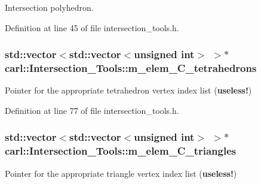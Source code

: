 Intersection polyhedron. 



Definition at line 45 of file intersection\+\_\+tools.\+h.

\hypertarget{classcarl_1_1_intersection___tools_a2f6b6fff82b9a02400d3aeb3db1f4c82}{}
\subsubsection[{m\+\_\+elem\+\_\+\+C\+\_\+tetrahedrons}]{\setlength{\rightskip}{0pt plus 5cm}std\+::vector$<$std\+::vector$<$unsigned int$>$ $>$$\ast$ carl\+::\+Intersection\+\_\+\+Tools\+::m\+\_\+elem\+\_\+\+C\+\_\+tetrahedrons\hspace{0.3cm}{\ttfamily [protected]}}\label{classcarl_1_1_intersection___tools_a2f6b6fff82b9a02400d3aeb3db1f4c82}


Pointer for the appropriate tetrahedron vertex index list ({\bfseries useless!}) 



Definition at line 77 of file intersection\+\_\+tools.\+h.

\hypertarget{classcarl_1_1_intersection___tools_a89a78135b49b49c32bec8be4016782b3}{}
\subsubsection[{m\+\_\+elem\+\_\+\+C\+\_\+triangles}]{\setlength{\rightskip}{0pt plus 5cm}std\+::vector$<$std\+::vector$<$unsigned int$>$ $>$$\ast$ carl\+::\+Intersection\+\_\+\+Tools\+::m\+\_\+elem\+\_\+\+C\+\_\+triangles\hspace{0.3cm}{\ttfamily [protected]}}\label{classcarl_1_1_intersection___tools_a89a78135b49b49c32bec8be4016782b3}


Pointer for the appropriate triangle vertex index list ({\bfseries useless!}) 



